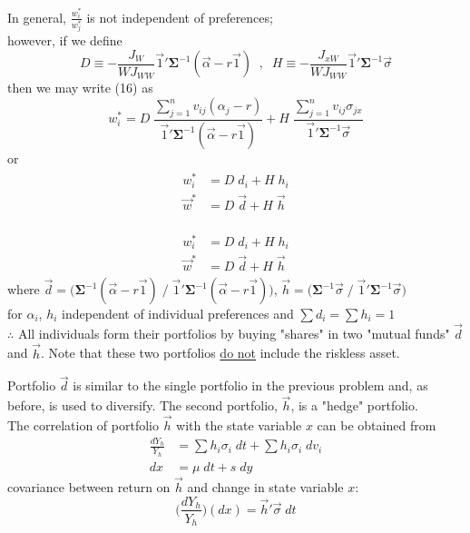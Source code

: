 \documentclass[
14pt,notheorems,hyperref={pdfauthor=whatever}
]{beamer}
\begin{document}
\begin{frame}
In general, $\frac{w_i^*}{w_j^*}$ is not independent of preferences;\\
however, if we define\\
\[ D \equiv -\frac{J_W}{W J_{WW}} \vec{1}' \bm{\Sigma}^{-1} (\vec\alpha-r\vec1) \;\;,\;\;
    H \equiv -\frac{J_{xW}}{W J_{WW}} \vec{1}' \bm{\Sigma}^{-1} \vec\sigma
\]
then we may write (16) as
\[ w_i^* = D\; \frac{\sum_{j=1}^n v_{ij}(\alpha_j-r)}{\vec1' \bm{\Sigma}^{-1}(\vec\alpha-r\vec1)} + H\; \frac{\sum_{j=1}^n v_{ij} \sigma_{jx}}{\vec1' \bm{\Sigma}^{-1}\vec\sigma}\]
or
\begin{align} \tag{17}
\begin{split}
    w_i^* &= D\;d_i + H\;h_i
    \\
    \vec{w}^* &=  D\;\vec{d} + H\;\vec{h}   
\end{split}
\end{align}
\end{frame}

\begin{frame}
\begin{align} \tag{17}
\begin{split}
    w_i^* &= D\;d_i + H\;h_i
    \\
    \vec{w}^* &=  D\;\vec{d} + H\;\vec{h}   
\end{split}
\end{align}
where $\vec{d} = \bigg( \bm{\Sigma}^{-1}(\vec\alpha-r\vec1)\;/\;\vec1' \bm{\Sigma}^{-1}(\vec\alpha-r\vec1) \bigg)$\;\;,\;\; $\vec{h} = \bigg( \bm{\Sigma}^{-1}\vec\sigma \;/\; \vec1'\bm{\Sigma}^{-1}\vec\sigma \bigg)$\\
\hfill\break
for $\alpha_i$, $h_i$ independent of individual preferences and $\sum d_i = \sum h_i = 1$\\
\hfill\break
$\therefore$ All individuals form their portfolios by buying "shares" in two "mutual funds" $\vec{d}$ and $\vec{h}$. Note that these two portfolios \underline{do not} include the riskless asset.
\end{frame}

\begin{frame}
Portfolio $\vec{d}$ is similar to the single portfolio in the previous problem and, as before, is used to diversify. The second portfolio, $\vec{h}$, is a "hedge" portfolio.\\
\hfill\break
The correlation of portfolio $\vec{h}$ with the state variable $x$ can be obtained from\\
\begin{align*}
    \frac{dY_h}{Y_h} &= \sum h_i \sigma_i\;dt + \sum h_i\sigma_i\;dv_i\\
    dx &= \mu\;dt + s\;dy
\end{align*}
\hfill\break
covariance between return on $\vec{h}$ and change in state variable $x$:
\[ \bigg( \frac{dY_h}{Y_h} \bigg) (dx) = \vec{h}'\vec\sigma\;dt \]
\end{frame}
\end{document}

